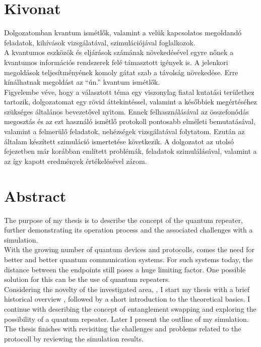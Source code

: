 
\chapter*{Kivonat}

Dolgozatomban kvantum ismétlők, valamint a velük kapcsolatos megoldandó feladatok, kihívások vizsgálatával, szimulációjával foglalkozok. \\
A kvantumos eszközök és eljárások számának növekedésével egyre nőnek a kvantumos információs rendszerek felé támasztott igények is. A jelenkori megoldások teljesítményének komoly gátat szab a távolság növekedése. Erre kínálhatnak megoldást az ``ún.'' kvantum ismétlők.\\
Figyelembe véve, hogy a választott téma egy viszonylag fiatal kutatási területhez tartozik, dolgozatomat egy rövid áttekintéssel, valamint a későbbiek megértéséhez szükséges általános bevezetővel nyitom. Ennek felhasználásával az összefonódás megosztás és az ezt használó ismétlő protokoll pontosabb elméleti bemutatásával, valamint a felmerülő feladatok, nehézségek vizsgálatával folytatom.  Ezután az általam készített szimuláció ismertetése következik. A dolgozatot az utolsó fejezetben már korábban említett problémák, feladatok szimulálásával, valamint a az így kapott eredmények értékelésével zárom.
\vfill

\chapter*{Abstract}
The purpose of my thesis is to describe the concept of the quantum repeater, further demonstrating its operation process and the associated challenges with a simulation.\\
With the growing number of quantum devices and protocolls, comes the need for better and better quantum communication systems. For such systems today, the distance between the endpoints still poses a huge limiting factor. One possible solution for this can be the use of quantum repeaters.\\
Considering the novelty of the investigated area, , I start my thesis with a brief historical overview , followed by a short introduction to the theoretical basics. I continue with describing the concept of entanglement swapping and exploring the possibility of a quantum repeater. Later I present the outline of my simulation. The thesis finishes with revisiting the challenges and problems related to the protocoll by reviewing the simulation results.
\vfill